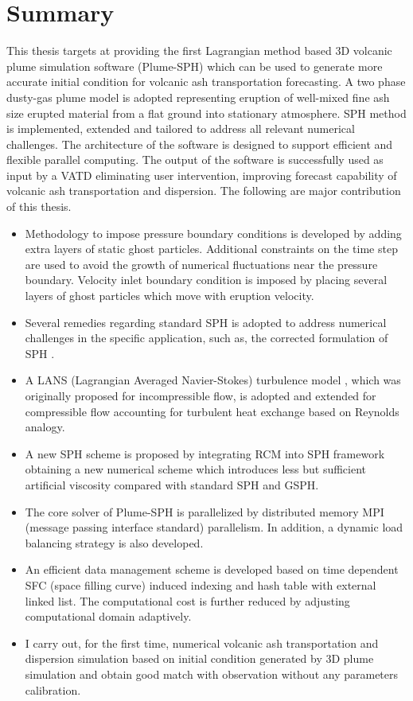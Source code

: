 \section{Summary}
This thesis targets at providing the first Lagrangian method based 3D volcanic plume simulation software (Plume-SPH) which can be used to generate more accurate initial condition for volcanic ash transportation forecasting. A two phase dusty-gas plume model is adopted representing eruption of well-mixed fine ash size erupted material from a flat ground into stationary atmosphere. SPH method is implemented, extended and tailored to address all relevant numerical challenges. The architecture of the software is designed to support efficient and flexible parallel computing. The output of the software is successfully used as input by a VATD eliminating user intervention, improving forecast capability of volcanic ash transportation and dispersion. The following are major contribution of this thesis.

\begin{itemize}
\item Methodology to impose pressure boundary conditions is developed by adding extra layers of static ghost particles. Additional constraints on the time step are used to avoid the growth of numerical fluctuations near the pressure boundary. Velocity inlet boundary condition is imposed by placing several layers of ghost particles which move with eruption velocity.
\item Several remedies regarding standard SPH is adopted to address numerical challenges in the specific application, such as, the corrected formulation of SPH \citep{chen1999improvement}.
\item  A LANS (Lagrangian Averaged Navier-Stokes) turbulence model \citep{monaghan2011turbulence}, which was originally proposed for incompressible flow, is adopted and extended for compressible flow accounting for turbulent heat exchange based on Reynolds analogy.
\item A new SPH scheme is proposed by integrating RCM into SPH framework obtaining a new numerical scheme which introduces less but sufficient artificial viscosity compared with standard SPH and GSPH.
\item The core solver of Plume-SPH is parallelized by distributed memory MPI (message passing interface standard) parallelism. In addition, a dynamic load balancing strategy is also developed. 
\item An efficient data management scheme is developed based on time dependent SFC (space filling curve) induced indexing and hash table with external linked list. The computational cost is further reduced by adjusting computational domain adaptively.
\item I carry out, for the first time, numerical volcanic ash transportation and dispersion simulation based on initial condition generated by 3D plume simulation and obtain good match with observation without any parameters calibration.
\end{itemize}

